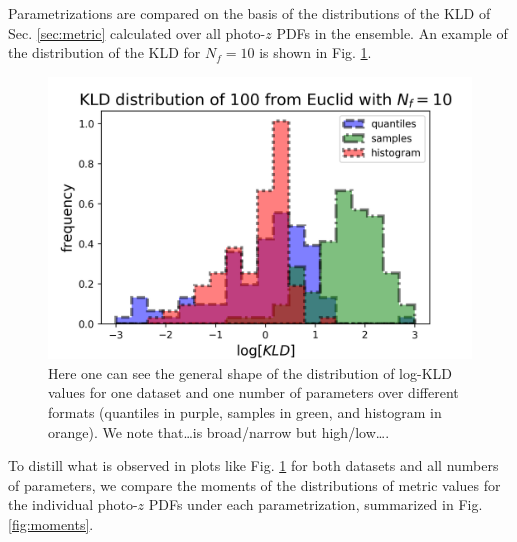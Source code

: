 \documentclass[\docopts]{\docclass}
\newcommand{\pz}{photo-$z$ PDF}
\begin{document}
Parametrizations are compared on the basis of the distributions of the KLD of 
Sec. \ref{sec:metric} calculated over all \pz s in the ensemble.  An example of 
the distribution of the KLD for $N_{f}=10$ is shown in Fig. 
\ref{fig:individual}.

\begin{figure}
  \includegraphics[width=0.9\columnwidth]{figures/individual_placeholder.png}
  \caption{Here one can see the general shape of the distribution of log-KLD 
values for one dataset and one number of parameters over different formats 
(quantiles in purple, samples in green, and histogram in orange).  We note 
that\dots is broad/narrow but high/low\dots.
  \label{fig:individual}}
\end{figure}

To distill what is observed in plots like Fig. \ref{fig:individual} for both 
datasets and all numbers of parameters, we compare the moments of the 
distributions of metric values for the individual \pz s under each 
parametrization, summarized in Fig. \ref{fig:moments}.
\end{document}

